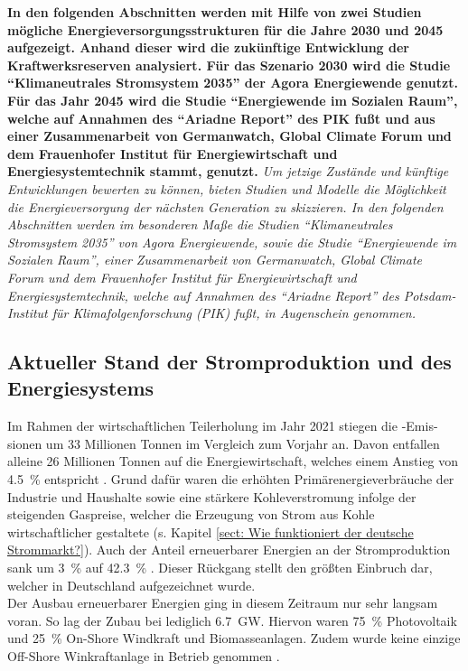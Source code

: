 	\textbf{In den folgenden Abschnitten werden mit Hilfe von zwei Studien mögliche Energieversorgungsstrukturen für die Jahre 2030 und 2045 aufgezeigt.
	Anhand dieser wird die zukünftige Entwicklung der Kraftwerksreserven analysiert.
	Für das Szenario 2030 wird die Studie "`Klimaneutrales Stromsystem 2035"' der Agora Energiewende genutzt.
	Für das Jahr 2045 wird die Studie "`Energiewende im Sozialen Raum"', welche auf Annahmen des "`Ariadne Report"' des PIK fußt und aus einer Zusammenarbeit von Germanwatch, Global Climate Forum und dem Frauenhofer Institut für Energiewirtschaft und Energiesystemtechnik stammt, genutzt.}   
	\textsl{Um jetzige Zustände und künftige Entwicklungen bewerten zu können, bieten Studien und Modelle die Möglichkeit die Energieversorgung der nächsten Generation zu skizzieren. 
	In den folgenden Abschnitten werden im besonderen Maße die Studien "`Klimaneutrales Stromsystem 2035"' von Agora Energiewende, sowie die Studie "`Energiewende im Sozialen Raum"', einer Zusammenarbeit von Germanwatch, Global Climate Forum und dem Frauenhofer Institut für Energiewirtschaft und Energiesystemtechnik, welche auf Annahmen des "`Ariadne Report"' des Potsdam-Institut für Klimafolgenforschung (PIK) fußt, in Augenschein genommen.}

	\subsection{Aktueller Stand der Stromproduktion und des Energiesystems}
	
		Im Rahmen der wirtschaftlichen Teilerholung im Jahr 2021 stiegen die \COO-Emis-sionen um 33 Millionen Tonnen im Vergleich zum Vorjahr an.
		Davon entfallen alleine 26 Millionen Tonnen auf die Energiewirtschaft, welches einem  Anstieg von \SI{4,5}{\percent} entspricht \cite[S.5]{Stand_der_Dinge}. 
		Grund dafür waren die erhöhten Primärenergieverbräuche der Industrie und Haushalte sowie eine stärkere Kohleverstromung infolge der steigenden Gaspreise, welcher die Erzeugung von Strom aus Kohle wirtschaftlicher gestaltete (s. Kapitel \ref{sect: Wie funktioniert der deutsche Strommarkt?}). 
		Auch der Anteil erneuerbarer Energien an der Stromproduktion sank um \SI{3}{\percent} auf \SI{42,3}{\percent} \cite[S.5]{Stand_der_Dinge}.
		Dieser Rückgang stellt den größten Einbruch dar, welcher in Deutschland aufgezeichnet wurde. \\
		
		Der Ausbau erneuerbarer Energien ging in diesem Zeitraum nur sehr langsam voran. 
		So lag der Zubau bei lediglich \SI{6,7}{\giga\watt}. 
		Hiervon waren \SI{75}{\percent} Photovoltaik und \SI{25}{\percent} On-Shore Windkraft und Biomasseanlagen. 
		Zudem wurde keine einzige Off-Shore Winkraftanlage in Betrieb genommen \cite[S.47 ff.]{Stand_der_Dinge}. 
	
